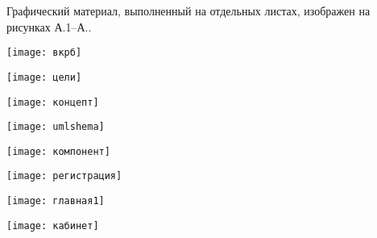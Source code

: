 
Графический материал, выполненный на отдельных листах,
изображен на рисунках А.1--А..
\setcounter{числоПлакатов}{0}

\renewcommand{\thefigure}{А.\arabic{figure}} %

\begin{landscape}
\begin{плакат}
	\centering
    \texttt{[image: вкрб]}
    \label{pl1:image}      
\end{плакат}

\begin{плакат}
	\centering
    \texttt{[image: цели]}
    \label{pl2:image}      
\end{плакат}

\begin{плакат}
	\centering
    \texttt{[image: концепт]}
    \label{pl3:image}      
\end{плакат}

\begin{плакат}
	\centering
    \texttt{[image: umlshema]}
    \label{pl4:image}      
\end{плакат}

\begin{плакат}
	\centering
	\texttt{[image: компонент]}
	\label{pl5:image}      
\end{плакат}

\begin{плакат}
	\centering
	\texttt{[image: регистрация]}
	\label{pl6:image}      
\end{плакат}

\begin{плакат}
	\centering
	\texttt{[image: главная1]}
	\label{pl7:image}      
\end{плакат}

\begin{плакат}
	\centering
	\texttt{[image: кабинет]}
	\label{pl8:image}      
\end{плакат}


\end{landscape}
